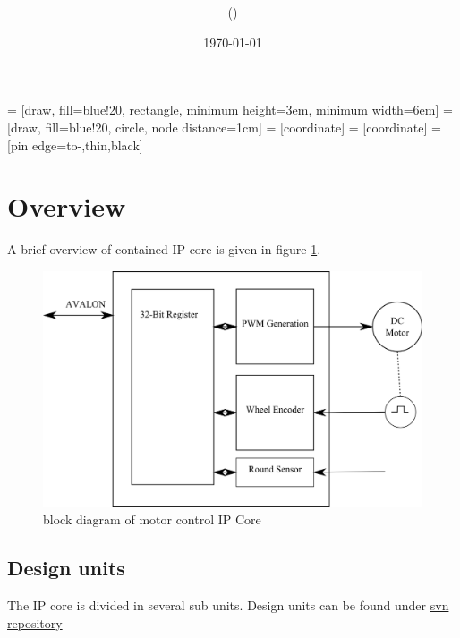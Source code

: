 \documentclass {scrartcl}
\title {\Subject \\ \VersionNr}
\author {\Name (\Number)}
\date {\today}
\begin{document}
 = [draw, fill=blue!20, rectangle, 
    minimum height=3em, minimum width=6em]
 = [draw, fill=blue!20, circle, node distance=1cm]
 = [coordinate]
 = [coordinate]
 = [pin edge={to-,thin,black}]

\maketitle
\tableofcontents
\newpage
\section{Overview}
A brief overview of contained IP-core is given in figure \ref{fig:block_IP}.
\begin{figure}[h]
	\centering
		\includegraphics{./Blockdiagram.PNG}
	\caption{block diagram of motor control IP Core}
	\label{fig:block_IP}
\end{figure}

\subsection{Design units}
The IP core is divided in several sub units. 
Design units can be found under \href {https://svn01.fh-hagenberg.at/projekte/SocGhostCar/trunk/04_software/fpga}{svn repository}
\end{document}
